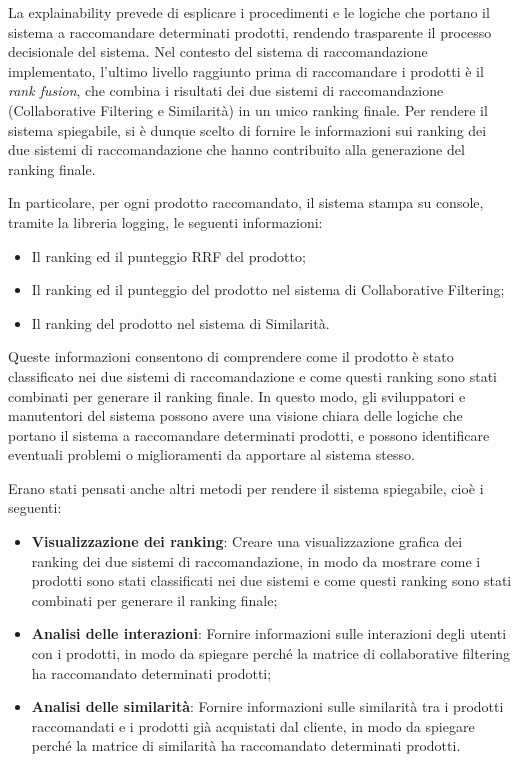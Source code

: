 La explainability prevede di esplicare i procedimenti e le logiche che portano il sistema a raccomandare determinati prodotti, rendendo trasparente il processo decisionale del sistema. Nel contesto del sistema di raccomandazione implementato, l'ultimo livello raggiunto prima di raccomandare i prodotti è il \emph{rank fusion}, che combina i risultati dei due sistemi di raccomandazione (Collaborative Filtering e Similarità) in un unico ranking finale. Per rendere il sistema spiegabile, si è dunque scelto di fornire le informazioni sui ranking dei due sistemi di raccomandazione che hanno contribuito alla generazione del ranking finale.

In particolare, per ogni prodotto raccomandato, il sistema stampa su console, tramite la libreria \gls{logging}, le seguenti informazioni:
\begin{itemize}
    \item Il ranking ed il punteggio RRF del prodotto;
    \item Il ranking ed il punteggio del prodotto nel sistema di Collaborative Filtering;
    \item Il ranking del prodotto nel sistema di Similarità.
\end{itemize}

Queste informazioni consentono di comprendere come il prodotto è stato classificato nei due sistemi di raccomandazione e come questi ranking sono stati combinati per generare il ranking finale. In questo modo, gli sviluppatori e manutentori del sistema possono avere una visione chiara delle logiche che portano il sistema a raccomandare determinati prodotti, e possono identificare eventuali problemi o miglioramenti da apportare al sistema stesso.

Erano stati pensati anche altri metodi per rendere il sistema spiegabile, cioè i seguenti:
\begin{itemize}
    \item \textbf{Visualizzazione dei ranking}: Creare una visualizzazione grafica dei ranking dei due sistemi di raccomandazione, in modo da mostrare come i prodotti sono stati classificati nei due sistemi e come questi ranking sono stati combinati per generare il ranking finale;
    \item \textbf{Analisi delle interazioni}: Fornire informazioni sulle interazioni degli utenti con i prodotti, in modo da spiegare perché la matrice di collaborative filtering ha raccomandato determinati prodotti;
    \item \textbf{Analisi delle similarità}: Fornire informazioni sulle similarità tra i prodotti raccomandati e i prodotti già acquistati dal cliente, in modo da spiegare perché la matrice di similarità ha raccomandato determinati prodotti.
\end{itemize}


